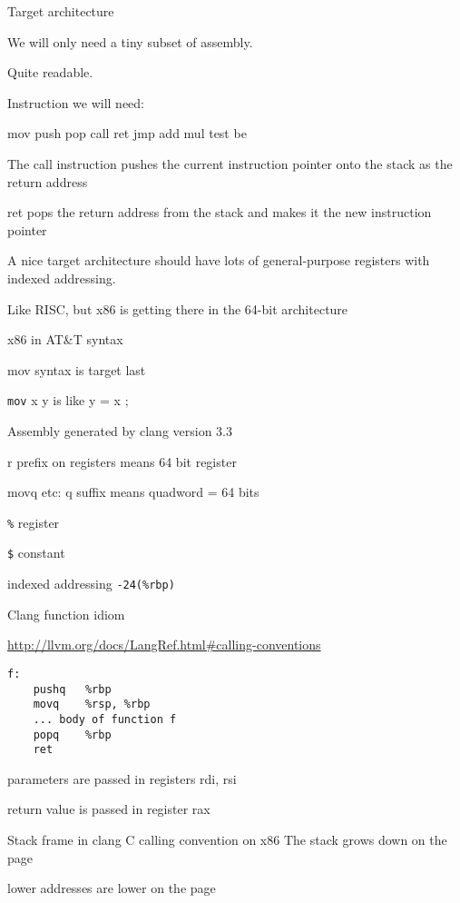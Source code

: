 \documentclass[landscape]{beamer}
\begin{document}
\begin{frame}{Target architecture}

We will only need a tiny subset of assembly.

Quite readable.

Instruction we will need:

mov push pop call ret jmp add mul test be

The call instruction pushes the current instruction pointer onto the stack as the return address

ret pops the return address from the stack and makes it the new instruction pointer

A nice target architecture should have lots of general-purpose registers with indexed addressing.

Like RISC, but x86 is getting there in the 64-bit architecture

\end{frame}

\begin{frame}{x86 in AT\&T syntax}

mov syntax is target last

\texttt{mov} x y is like y = x ;

Assembly generated by clang version 3.3

r prefix on registers means 64 bit register

movq etc: q suffix means quadword = 64 bits

\texttt{\%} register

\texttt{\$} constant

indexed addressing \texttt{-24(\%rbp)}

\end{frame}


\begin{frame}[fragile]{Clang function idiom}

\url{http://llvm.org/docs/LangRef.html#calling-conventions}

\begin{verbatim}
f:
	pushq	%rbp
	movq	%rsp, %rbp
    ... body of function f
	popq	%rbp
	ret
\end{verbatim}

parameters are passed in registers rdi, rsi

return value is passed in register rax
\end{frame}


\begin{frame}[fragile]{Stack frame in clang C calling convention on x86}
The stack grows down on the page

lower addresses are lower on the page

  
\end{frame} 
\end{document}
